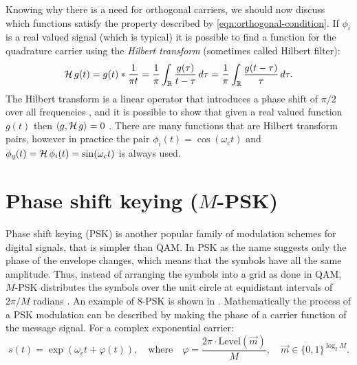 Knowing why there is a need for orthogonal carriers, we should now discuss which functions satisfy the property described by \eqref{eqn:orthogonal-condition}. If \(\phi_i\) is a real valued signal (which is typical) it is possible to find a function for the quadrature carrier using the \emph{Hilbert transform} (sometimes called Hilbert filter):
\begin{equation}
	\operatorname{\mathcal{H}} g(t) = g(t) * \frac{1}{\pi t}
		= \frac{1}{\pi} \int_\mathbb{R} \frac{g(\tau)}{t - \tau} \,d\tau
		= \frac{1}{\pi} \int_\mathbb{R} \frac{g(t - \tau)}{\tau} \,d\tau.
\end{equation}
The Hilbert transform is a linear operator that introduces a phase shift of \(\pi / 2\) over all frequencies \cite{Hsu,Gallager}, and it is possible to show that given a real valued function \(g(t)\) then \(\langle g, \operatorname{\mathcal{H}} g \rangle = 0\) \cite{Kschischang,Kneubuehler}. There are many functions that are Hilbert transform pairs, however in practice the pair \(\phi_i(t) = \cos(\omega_c t)\) and \(\phi_q(t) = \operatorname{\mathcal{H}} \phi_i(t) = \sin(\omega_c t)\) is always used.



\section{Phase shift keying (\(M\)-PSK)}

Phase shift keying (PSK) is another popular family of modulation schemes for digital signals, that is simpler than QAM. In PSK as the name suggests only the phase of the envelope changes, which means that the symbols have all the same amplitude. Thus, instead of arranging the symbols into a grid as done in QAM, \(M\)-PSK distributes the symbols over the unit circle at equidistant intervals of \(2\pi / M\) radians \cite{Mathis,Kneubuehler}. An example of 8-PSK is shown in . Mathematically the process of a PSK modulation can be described by making the phase of a carrier function of the message signal. For a complex exponential carrier:
\begin{equation}
	s(t) = \exp\left(\omega_c t + \varphi(t)\right), \quad\text{where}\quad
	\varphi = \frac{2\pi \cdot \text{Level}(\vec{m})}{M}, \quad \vec{m} \in \{0,1\}^{\log_2 M}.
\end{equation}

